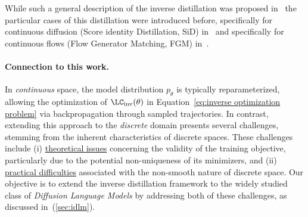
  While such a general description of the inverse distillation was proposed in~\citep{kornilov2025universal} the particular cases of this distillation were introduced before, specifically for continuous diffusion (Score identity Distillation, SiD) in~\citep{zhou2024score} and specifically for continuous flows (Flow Generator Matching, FGM) in~\citep{huang2024flow}. 

  \paragraph{Connection to this work.}
    In \emph{continuous} space, the model distribution $p_\theta$ is typically reparameterized, allowing the optimization of $\LC_{\text{inv}}(\theta)$ in Equation~\eqref{eq:inverse optimization problem} via backpropagation through sampled trajectories. In contrast, extending this approach to the \emph{discrete} domain presents several challenges, stemming from the inherent characteristics of discrete spaces. These challenges include (i) \underline{theoretical issues} concerning the validity of the training objective, particularly due to the potential non-uniqueness of its minimizers, and (ii) \underline{practical difficulties} associated with the non-smooth nature of discrete space. Our objective is to extend the inverse distillation framework to the widely studied class of \emph{Diffusion Language Models} by addressing both of these challenges, as discussed in~(\wasyparagraph\ref{sec:idlm}).
  
